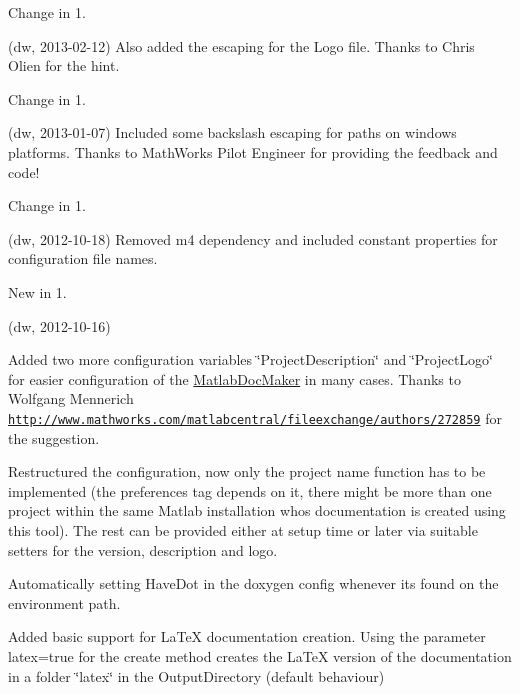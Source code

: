 \begin{DoxyRefDesc}{Change in 1.}
\item[\hyperlink{changelog1_5__changelog1_5000003}{Change in 1.\+5}](dw, 2013-\/02-\/12) Also added the escaping for the Logo file. Thanks to Chris Olien for the hint.\end{DoxyRefDesc}


\begin{DoxyRefDesc}{Change in 1.}
\item[\hyperlink{changelog1_5__changelog1_5000004}{Change in 1.\+5}](dw, 2013-\/01-\/07) Included some backslash escaping for paths on windows platforms. Thanks to Math\+Works Pilot Engineer \textquotesingle{} for providing the feedback and code!\end{DoxyRefDesc}


\begin{DoxyRefDesc}{Change in 1.}
\item[\hyperlink{changelog1_4__changelog1_4000001}{Change in 1.\+4}](dw, 2012-\/10-\/18) Removed {\ttfamily m4} dependency and included constant properties for configuration file names.\end{DoxyRefDesc}


\begin{DoxyRefDesc}{New in 1.}
\item[\hyperlink{newfeat1_4__newfeat1_4000001}{New in 1.\+4}](dw, 2012-\/10-\/16)
\begin{DoxyItemize}
\item Added two more configuration variables \char`\"{}\+Project\+Description\char`\"{} and \char`\"{}\+Project\+Logo\char`\"{} for easier configuration of the \hyperlink{class_matlab_doc_maker}{Matlab\+Doc\+Maker} in many cases. Thanks to Wolfgang Mennerich \href{http://www.mathworks.com/matlabcentral/fileexchange/authors/272859}{\tt http\+://www.\+mathworks.\+com/matlabcentral/fileexchange/authors/272859} for the suggestion.
\item Restructured the configuration, now only the project name function has to be implemented (the preferences tag depends on it, there might be more than one project within the same Matlab installation whos documentation is created using this tool). The rest can be provided either at setup time or later via suitable setters for the version, description and logo.
\item Automatically setting Have\+Dot in the doxygen config whenever its found on the environment path.
\item Added basic support for La\+TeX documentation creation. Using the parameter {\ttfamily latex}=true for the create method creates the La\+TeX version of the documentation in a folder \char`\"{}latex\char`\"{} in the Output\+Directory (default behaviour)
\end{DoxyItemize}\end{DoxyRefDesc}


